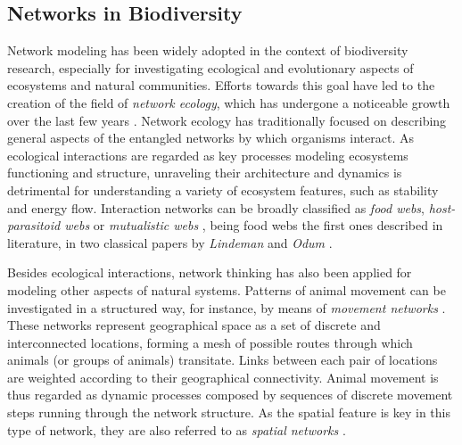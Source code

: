 \subsection{Networks in Biodiversity}
Network modeling has been widely adopted in the context of biodiversity research, especially for investigating ecological and evolutionary aspects of ecosystems and natural communities. 
Efforts towards this goal have led to the creation of the field of \textit{network ecology}, which has undergone a noticeable growth over the last few years \cite{Borrett2014}.
Network ecology has traditionally focused on describing general aspects of the entangled networks by which organisms interact.
As ecological interactions are regarded as key processes modeling ecosystems functioning and structure, unraveling their architecture and dynamics is detrimental for understanding a variety of ecosystem features, such as stability and energy flow.
%
Interaction networks can be broadly classified as \textit{food webs}, \textit{host-parasitoid webs} or \textit{mutualistic webs} \cite{Ings2009}, being food webs the first ones described in literature, in two classical papers by \textit{Lindeman} and \textit{Odum} \cite{lindeman1942trophic, odum1956primary}. 
%

Besides ecological interactions, network thinking has also been applied for modeling other aspects of natural systems.
Patterns of animal movement can be investigated in a structured way, for instance, by means of \textit{movement networks} \cite{Jacoby2016a}.
These networks represent geographical space as a set of discrete and interconnected locations, forming a mesh of possible routes through which animals (or groups of animals) transitate. 
Links between each pair of locations are weighted according to their geographical connectivity.
Animal movement is thus regarded as dynamic processes composed by sequences of discrete movement steps running through the network structure.
As the spatial feature is key in this type of network, they are also referred to as \textit{spatial networks} \cite{Bascompte2007}.
%

